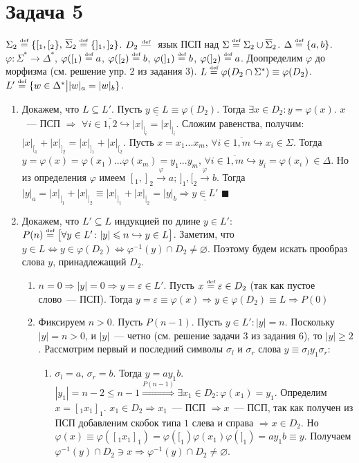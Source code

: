 \documentclass[a4paper]{article}
\def\eqdef{\overset{\mbox{\tiny def}}{=}}
\begin{document}
\section*{Задача 5}
$\Sigma_2\eqdef\{[_1,[_2\},\,\overline{\Sigma}_2\eqdef\{]_1,]_2\}$. $D_2\overset{\mbox{\tiny def}}{\mbox{ --- }}$ язык ПСП над $\Sigma\eqdef \Sigma_2\cup\overline{\Sigma}_2$. $\Delta\eqdef\{a,b\}$. $\varphi\colon \Sigma^*\longrightarrow \Delta^*$, $\varphi([_1)\eqdef a$, $\varphi([_2)\eqdef b$, $\varphi(]_1)\eqdef b$, $\varphi(]_2)\eqdef a$. Доопределим $\varphi$ до морфизма (см. решение упр. 2 из задания 3). $L\eqdef \varphi(D_2\cap \Sigma^*)\equiv \varphi(D_2)$. $L'\eqdef\{w\in\Delta^*\big||w|_a=|w|_b\}$.
\begin{enumerate}
\item Докажем, что $L\subseteq L'$. Пусть $\underline{y\in L}\equiv \varphi(D_2)$. Тогда $\exists x\in D_2\colon y=\varphi(x)$. $x$~--- ПСП $\Rightarrow$ $\forall i\in\overline{1,2}\hookrightarrow |x|_{[_i}=|x|_{]_i}$. Сложим равенства, получим: $|x|_{[_1}+|x|_{]_2}=|x|_{]_1}+|x|_{[_2}$. Пусть $x=x_1...x_m,\,\forall i\in\overline{1,m}\hookrightarrow x_i\in\Sigma$. Тогда $y=\varphi(x)=\varphi(x_1)...\varphi(x_m)=y_1...y_m,\,\forall i\in\overline{1,m}\hookrightarrow y_i=\varphi(x_i)\in\Delta$. Но из определения $\varphi$ имеем $[_1,]_2\overset{\varphi}{\rightarrow}a;\,]_1,[_2\overset{\varphi}{\rightarrow}b$. Тогда $|y|_a=|x|_{[_1}+|x|_{]_2}\equiv|x|_{]_1}+|x|_{[_2}=|y|_b\Rightarrow \underline{y\in L'}$ $\blacksquare$
\item Докажем, что $L'\subseteq L$ индукцией по длине $y\in L'$: $P(n)\eqdef\big[\forall y\in L'\colon |y|\leqslant n\hookrightarrow y\in L\big]$.\newline
Заметим, что $y\in L\Leftrightarrow y\in \varphi(D_2)\Leftrightarrow \varphi^{-1}(y)\cap D_2\neq\varnothing$. Поэтому будем искать прообраз слова $y$, принадлежащий $D_2$.\begin{enumerate}
\item $n=0\Rightarrow |y|=0\Rightarrow y=\varepsilon\in L'$. Пусть $x\eqdef\varepsilon\in D_2$ (так как пустое слово~--- ПСП). Тогда $y=\varepsilon\equiv\varphi(x)\Rightarrow y\in \varphi(D_2)\equiv L\Rightarrow P(0)$
\item Фиксируем $n>0$. Пусть $P(n-1)$. Пусть $y\in L'\colon |y|=n$. Поскольку $|y|=n>0$, и $|y|$~--- четно (см. решение задачи 3 из задания 6), то $|y|\geqslant 2$. Рассмотрим первый и последний символы $\sigma_l$ и $\sigma_r$ слова $y\equiv \sigma_ly_1\sigma_r$:\begin{enumerate}
\item $\sigma_l=a,\,\sigma_r=b$. Тогда $y=ay_1b$. $|y_1|=n-2\leqslant n-1\overset{P(n-1)}{\Rightarrow}\exists x_1\in D_2\colon \varphi(x_1)=y_1$. Определим $x=[_1x_1]_1$. $x_1\in D_2\Rightarrow x_1$~--- ПСП $\Rightarrow x$~--- ПСП, так как получен из ПСП добавленим скобок типа $1$ слева и справа $\Rightarrow x\in D_2$. Но $\varphi(x)\equiv\varphi([_1x_1]_1)=\varphi([_1)\varphi(x_1)\varphi(]_1)=ay_1b\equiv y$. Получаем $\varphi^{-1}(y)\cap D_2\ni x\Rightarrow \varphi^{-1}(y)\cap D_2\neq\varnothing$.

\end{enumerate}
\end{enumerate}
\end{enumerate}
\end{document}
